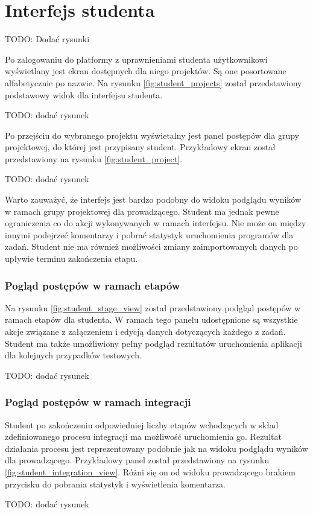 \section{Interfejs studenta}
TODO: Dodać rysunki

Po zalogowaniu do platformy z uprawnieniami studenta użytkownikowi wyświetlany jest ekran dostępnych dla niego projektów.
Są one posortowane alfabetycznie po nazwie.
Na rysunku \ref{fig:student_projects} został przedstawiony podstawowy widok dla interfejsu studenta.

TODO: dodać rysunek

Po przejściu do wybranego projektu wyświetalny jest panel postępów dla grupy projektowej, do której jest przypisany student.
Przykładowy ekran został przedstawiony na rysunku \ref{fig:student_project}.

TODO: dodać rysunek

Warto zauważyć, że interfejs jest bardzo podobny do widoku podglądu wyników w ramach grupy projektowej dla prowadzącego.
Student ma jednak pewne ograniczenia co do akcji wykonywanych w ramach interfejsu.
Nie może on między innymi podejrzeć komentarzy i pobrać statystyk uruchomienia programów dla zadań.
Student nie ma również możliwości zmiany zaimportowanych danych po upływie terminu zakończenia etapu.

\subsubsection{Pogląd postępów w ramach etapów}

Na rysunku \ref{fig:student_stage_view} został przedstawiony podgląd postępów w ramach etapów dla studenta.
W ramach tego panelu udostępnione są wszystkie akcje związane z załączeniem i edycją danych dotyczących każdego z zadań.
Student ma także umożliwiony pełny podgląd rezultatów uruchomienia aplikacji dla kolejnych przypadków testowych.

TODO: dodać rysunek

\subsubsection{Pogląd postępów w ramach integracji}

Student po zakończeniu odpowiedniej liczby etapów wchodzących w skład zdefiniowanego procesu integracji ma możliwość uruchomienia go.
Rezultat działania procesu jest reprezentowany podobnie jak na widoku podglądu wyników dla prowadzącego.
Przykładowy panel został przedstawiony na rysunku \ref{fig:student_integration_view}.
Różni się on od widoku prowadzącego brakiem przycisku do pobrania statystyk i wyświetlenia komentarza.

TODO: dodać rysunek